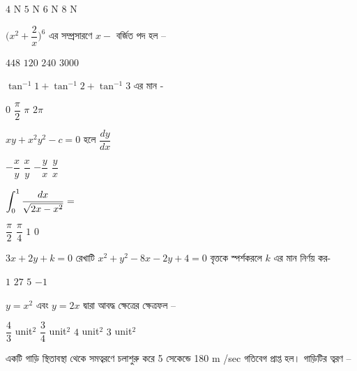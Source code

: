 \documentclass[addpoints]{exam}
\begin{document}
\begin{questions}
\begin{oneparchoices}
\choice $ 4 $ N
\choice $ 5 $ N
\choice $ 6 $ N
\choice $ 8 $ N

\end{oneparchoices}

\question $ \Bigg(x^{2} + \dfrac{2}{x} \Bigg)^{6} $ এর সম্প্রসারণে $ x- $ বর্জিত পদ হল – 

\begin{oneparchoices}
\choice $ 448 $
\choice $ 120 $
\choice $ 240 $
\choice  $ 3000 $
\end{oneparchoices}


\question  $ \tan^{-1}1+\tan^{-1}2 + \tan^{-1}3 $ এর মান - 

\begin{oneparchoices}
\choice $ 0 $
\choice $ \dfrac{\pi}{2} $
\choice $ \pi $
\choice $ 2\pi $
\end{oneparchoices}

\question $ xy+x^{2}y^{2}-c=0 $ হলে $ \dfrac{dy}{dx} $

\begin{oneparchoices}
\choice $ -\dfrac{x}{y} $
\choice $ \dfrac{x}{y} $
\choice $ -\dfrac{y}{x} $
\choice  $ \dfrac{y}{x} $
\end{oneparchoices}

\question  $ \mathlarger{\int_{0}^{1}\dfrac{dx}{\sqrt{2x-x^{2}}}} = $ 

\begin{oneparchoices}
\choice $ \dfrac{\pi}{2} $
\choice $ \dfrac{\pi}{4} $
\choice $ 1 $
\choice $ 0 $
\end{oneparchoices}

\question $ 3x+2y+k=0 $ রেখাটি $ x^{2}+y^{2}-8x-2y+4=0 $ বৃত্তকে স্পর্শকরলে $ k $ এর মান নির্ণয় কর-

\begin{oneparchoices}
\choice $ 1 $
\choice $ 27 $
\choice $ 5 $
\choice  $ -1 $
\end{oneparchoices}

\question  $ y=x^{2} $ এবং $ y=2x $ দ্বারা আবদ্ধ ক্ষেত্রের ক্ষেত্রফল – 

\begin{oneparchoices}
\choice $ \dfrac{4}{3} $ unit$ ^{2} $
\choice $ \dfrac{3}{4} $ unit$ ^{2} $
\choice $ 4 $ unit$ ^{2} $
\choice $ 3 $ unit$ ^{2} $
\end{oneparchoices}

\question একটি গাড়ি স্থিতাবস্থা থেকে সমত্বরণে চলাশুরু করে  5 সেকেন্ডে 180 m /sec  গতিবেগ প্রাপ্ত হল। গাড়িটির ত্বরণ – 


\end{questions}
\end{document}
